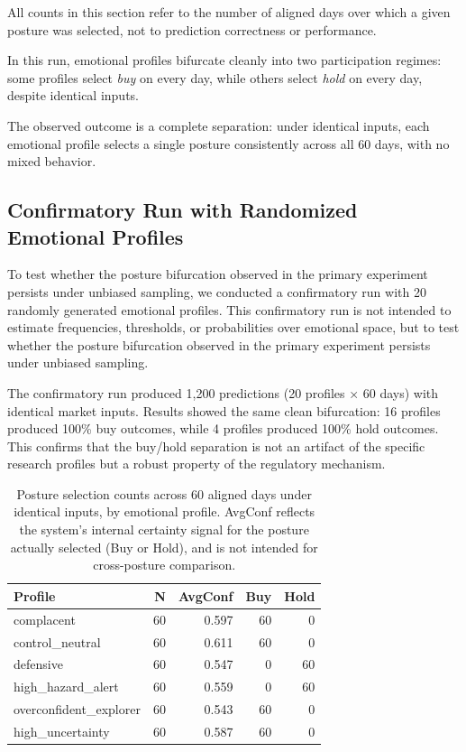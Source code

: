 \documentclass[12pt,a4paper]{article}
\begin{document}
All counts in this section refer to the number of aligned days over which a given posture was selected, not to prediction correctness or performance.

In this run, emotional profiles bifurcate cleanly into two participation regimes: some profiles select \emph{buy} on every day, while others select \emph{hold} on every day, despite identical inputs.

The observed outcome is a complete separation: under identical inputs, each emotional profile selects a single posture consistently across all 60 days, with no mixed behavior.

\subsection{Confirmatory Run with Randomized Emotional Profiles}

To test whether the posture bifurcation observed in the primary experiment persists under unbiased sampling, we conducted a confirmatory run with 20 randomly generated emotional profiles. This confirmatory run is not intended to estimate frequencies, thresholds, or probabilities over emotional space, but to test whether the posture bifurcation observed in the primary experiment persists under unbiased sampling.

The confirmatory run produced 1,200 predictions (20 profiles × 60 days) with identical market inputs. Results showed the same clean bifurcation: 16 profiles produced 100\% buy outcomes, while 4 profiles produced 100\% hold outcomes. This confirms that the buy/hold separation is not an artifact of the specific research profiles but a robust property of the regulatory mechanism.

\begin{table}[H]
\centering
\begin{tabular}{lrrrr}
\hline
Profile & N & AvgConf & Buy & Hold \\
\hline
complacent              & 60 & 0.597 & 60 & 0 \\
control\_neutral        & 60 & 0.611 & 60 & 0 \\
defensive               & 60 & 0.547 & 0  & 60 \\
high\_hazard\_alert     & 60 & 0.559 & 0  & 60 \\
overconfident\_explorer & 60 & 0.543 & 60 & 0 \\
high\_uncertainty       & 60 & 0.587 & 60 & 0 \\
\hline
\end{tabular}
\caption{Posture selection counts across 60 aligned days under identical inputs, by emotional profile. AvgConf reflects the system's internal certainty signal for the posture actually selected (Buy or Hold), and is not intended for cross-posture comparison.}
\label{tab:posture_dist}
\end{table}
\end{document}
